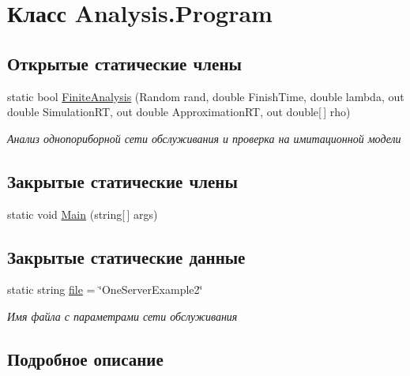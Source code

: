 \hypertarget{class_analysis_1_1_program}{}\section{Класс Analysis.\+Program}
\label{class_analysis_1_1_program}
\subsection*{Открытые статические члены}
\begin{DoxyCompactItemize}
\item 
static bool \hyperlink{class_analysis_1_1_program_a1d8b267dd093b57dc83268ebd548a73a}{Finite\+Analysis} (Random rand, double Finish\+Time, double lambda, out double Simulation\+RT, out double Approximation\+RT, out double\mbox{[}$\,$\mbox{]} rho)
\begin{DoxyCompactList}\small\item\em Анализ однопориборной сети обслуживания и проверка на имитационной модели \end{DoxyCompactList}\end{DoxyCompactItemize}
\subsection*{Закрытые статические члены}
\begin{DoxyCompactItemize}
\item 
static void \hyperlink{class_analysis_1_1_program_a9ad75be60bacf9d163fb2fa45cb94e18}{Main} (string\mbox{[}$\,$\mbox{]} args)
\end{DoxyCompactItemize}
\subsection*{Закрытые статические данные}
\begin{DoxyCompactItemize}
\item 
static string \hyperlink{class_analysis_1_1_program_abbd153e2a54cae09e6cbb7092163857f}{file} = \char`\"{}One\+Server\+Example2\char`\"{}
\begin{DoxyCompactList}\small\item\em Имя файла с параметрами сети обслуживания \end{DoxyCompactList}\end{DoxyCompactItemize}


\subsection{Подробное описание}



